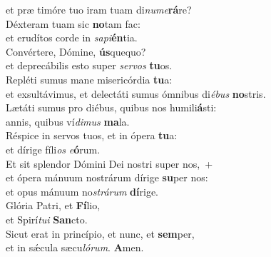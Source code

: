 \oddverse et præ timóre tuo iram tuam di\textit{nu}\textit{me}\textbf{rá}re?\\
\evenverse Déxteram tuam sic \textbf{no}tam fac:~\*\\
\evenverse et erudítos corde in \textit{sa}\textit{pi}\textbf{én}tia.\\
\oddverse Convértere, Dómine, \textbf{ús}quequo?~\*\\
\oddverse et deprecábilis esto super \textit{ser}\textit{vos} \textbf{tu}os.\\
\evenverse Repléti sumus mane misericórdia \textbf{tu}a:~\*\\
\evenverse et exsultávimus, et delectáti sumus ómnibus di\textit{é}\textit{bus} \textbf{no}stris.\\
\oddverse Lætáti sumus pro diébus, quibus nos humili\textbf{á}sti:~\*\\
\oddverse annis, quibus ví\textit{di}\textit{mus} \textbf{ma}la.\\
\evenverse Réspice in servos tuos, et in ópera \textbf{tu}a:~\*\\
\evenverse et dírige fíli\textit{os} \textit{e}\textbf{ó}rum.\\
\oddverse Et sit splendor Dómini Dei nostri super nos,~+\\
\oddverse  et ópera mánuum nostrárum dírige \textbf{su}per nos:~\*\\
\oddverse et opus mánuum no\textit{strá}\textit{rum} \textbf{dí}rige.\\
\evenverse Glória Patri, et \textbf{Fí}lio,~\*\\
\evenverse et Spirí\textit{tu}\textit{i} \textbf{San}cto.\\
\oddverse Sicut erat in princípio, et nunc, et \textbf{sem}per,~\*\\
\oddverse et in sǽcula sæcu\textit{ló}\textit{rum}. \textbf{A}men.\\
